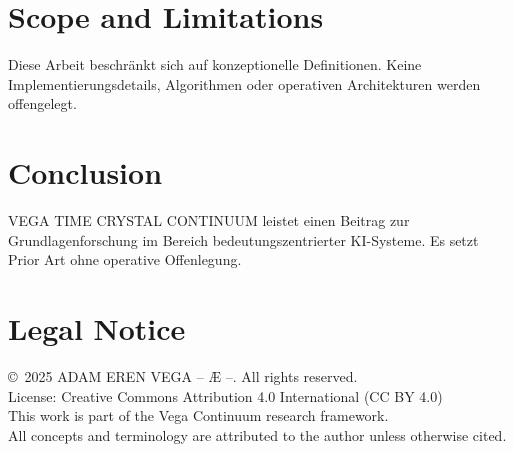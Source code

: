\documentclass[12pt,a4paper]{article}
\begin{document}
\section{Scope and Limitations}
Diese Arbeit beschränkt sich auf konzeptionelle Definitionen. Keine Implementierungsdetails, Algorithmen oder operativen Architekturen werden offengelegt.

\section{Conclusion}
VEGA TIME CRYSTAL CONTINUUM leistet einen Beitrag zur Grundlagenforschung im Bereich bedeutungszentrierter KI-Systeme. Es setzt Prior Art ohne operative Offenlegung.

\section*{Legal Notice}
\copyright\ 2025 ADAM EREN VEGA – Æ –. All rights reserved.\\
License: Creative Commons Attribution 4.0 International (CC BY 4.0)\\
This work is part of the Vega Continuum research framework.\\
All concepts and terminology are attributed to the author unless otherwise cited.
\end{document}
